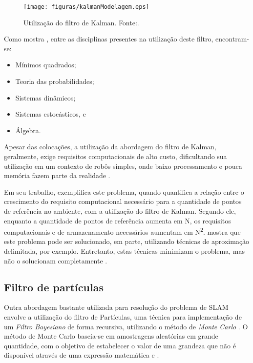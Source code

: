 \begin{figure}[H]
	\centering
	\texttt{[image: figuras/kalmanModelagem.eps]}
	\caption[Utilização do filtro de Kalman]{Utilização do filtro de Kalman. Fonte:\cite{agenteExploratorioKalman}.}
	\label{img:kalmanModelagem}
\end{figure}

Como mostra \cite{theCleaningProject}, entre as disciplinas presentes na utilização deste filtro, encontram-se:
\begin{itemize}
	\item Mínimos quadrados;
	\item Teoria das probabilidades;
	\item Sistemas dinâmicos;
	\item Sistemas estocásticos, e
	\item Álgebra.
\end{itemize}

Apesar das colocações, a utilização da abordagem do filtro de Kalman, geralmente, exige requisitos computacionais de alto custo, dificultando sua utilização em um contexto de robôs simples, onde baixo processamento e pouca memória fazem parte da realidade \cite{agenteExploratorioKalman}.

 Em seu trabalho, \cite{slamProblem} exemplifica este problema, quando quantifica a relação entre o crescimento do requisito computacional necessário para a quantidade de pontos de referência no ambiente, com a utilização do filtro de Kalman. Segundo ele, enquanto a quantidade de pontos de referência aumenta em N, os requisitos computacionais e de armazenamento necessários aumentam em N\textsuperscript{2}. \cite{slamProblem} mostra que este problema pode ser solucionado, em parte, utilizando técnicas de aproximação delimitada, por exemplo. Entretanto, estas técnicas minimizam o problema, mas não o solucionam completamente \cite{slamProblem}.


 \subsection{Filtro de partículas} %
 \label{sub:filtro_de_partículas}

Outra abordagem bastante utilizada para resolução do problema de SLAM envolve a utilização do filtro de Partículas, uma técnica para implementação de um \textit{Filtro Bayesiano} de forma recursiva, utilizando o método de \textit{Monte Carlo} \cite{integrationVisionSLAMnonlinear}. O método de Monte Carlo baseia-se em amostragens aleatórias em grande quantidade, com o objetivo de estabelecer o valor de uma grandeza que não é disponível através de uma expressão matemática \cite{mooney1997monte} e \cite{comparacaoKalmanParticulas}.

